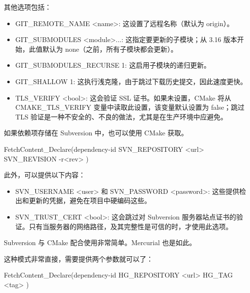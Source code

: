 其他选项包括：

\begin{itemize}
\item
GIT\_REMOTE\_NAME <name>: 这设置了远程名称（默认为 origin）。

\item
GIT\_SUBMODULES <module>...: 这指定要更新的子模块；从 3.16 版本开始，此值默认为 none（之前，所有子模块都会更新）。

\item
GIT\_SUBMODULES\_RECURSE 1: 这启用子模块的递归更新。

\item
GIT\_SHALLOW 1: 这执行浅克隆，由于跳过下载历史提交，因此速度更快。

\item
TLS\_VERIFY <bool>: 这会验证 SSL 证书。如果未设置，CMake 将从 CMAKE\_TLS\_VERIFY 变量中读取此设置，该变量默认设置为 false；跳过 TLS 验证是一种不安全的、不良的做法，尤其是在生产环境中应避免。
\end{itemize}

如果依赖项存储在 Subversion 中，也可以使用 CMake 获取。


\begin{shell}
FetchContent_Declare(dependency-id
                     SVN_REPOSITORY <url>
                     SVN_REVISION -r<rev>
)
\end{shell}

此外，可以提供以下内容：

\begin{itemize}
\item
SVN\_USERNAME <user> 和 SVN\_PASSWORD <password>: 这些提供检出和更新的凭据，避免在项目中硬编码这些。

\item
SVN\_TRUST\_CERT <bool>: 这会跳过对 Subversion 服务器站点证书的验证。只有当服务器的网络路径，及其完整性是可信的时，才使用此选项。
\end{itemize}

Subversion 与 CMake 配合使用非常简单。Mercurial 也是如此。


这种模式非常直接，需要提供两个参数就可以了：

\begin{shell}
FetchContent_Declare(dependency-id
                     HG_REPOSITORY <url>
                     HG_TAG <tag>
)
\end{shell}

